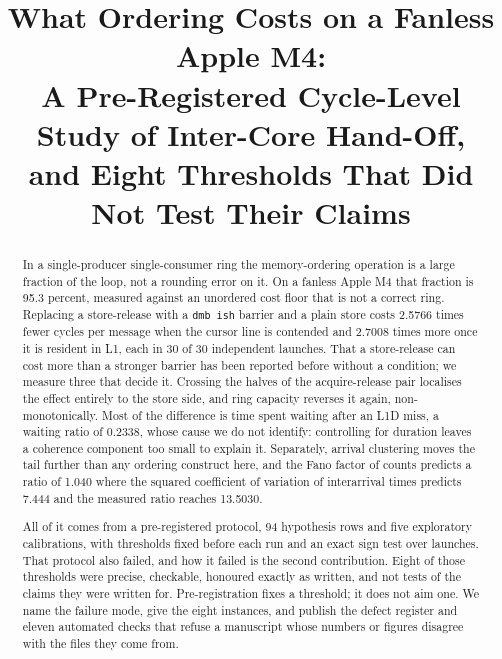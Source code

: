 \documentclass[conference]{IEEEtran}
\begin{document}
\title{What Ordering Costs on a Fanless Apple M4:\\
A Pre-Registered Cycle-Level Study of Inter-Core Hand-Off,\\
and Eight Thresholds That Did Not Test Their Claims}

\author{
}

\maketitle
{}

\begin{abstract}
In a single-producer single-consumer ring the memory-ordering operation is a
large fraction of the loop, not a rounding error on it. On a fanless
Apple M4 that fraction is 95.3 percent, measured against an unordered cost
floor that is not a correct ring.
Replacing a store-release with a \texttt{dmb ish} barrier and a plain store
costs 2.5766 times fewer cycles per message when the cursor line is contended
and 2.7008 times more once it is resident in L1, each in 30 of 30 independent
launches. That a store-release can cost more than a stronger barrier has been
reported before without a condition; we measure three that decide it. Crossing the halves of the acquire-release pair localises the effect
entirely to the store side, and ring capacity reverses it again,
non-monotonically. Most of the difference is time spent waiting after an L1D
miss, a waiting ratio of 0.2338, whose cause we do not identify: controlling
for duration leaves a coherence component too small to explain it. Separately,
arrival clustering moves the tail further than any ordering construct here, and
the Fano factor of counts predicts a ratio of 1.040 where the squared
coefficient of variation of interarrival times predicts 7.444 and the measured
ratio reaches 13.5030.

All of it comes from a pre-registered protocol, 94 hypothesis rows and five
exploratory calibrations, with thresholds fixed before each run and an exact
sign test over launches. That protocol also failed, and how it failed is the
second contribution. Eight of those thresholds were precise, checkable,
honoured exactly as written, and not tests of the claims they were written for.
Pre-registration fixes a threshold; it does not aim one. We name the failure
mode, give the eight instances, and publish the defect register and eleven
automated checks that refuse a manuscript whose numbers or figures disagree
with the files they come from.
\end{abstract}
\end{document}
